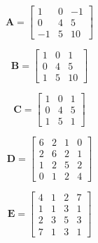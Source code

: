\documentclass[letterpaper, 12pt]{article}
\begin{document}
\begin{center}
    \begin{minipage}{0.32\textwidth}
    \centering
    \[
    \mathbf{A} =
    \begin{bmatrix}
    1 & 0 & -1 \\
    0 & 4 & 5 \\
    -1 & 5 & 10
    \end{bmatrix}
    \]
    \end{minipage}
    \hfill
    \begin{minipage}{0.32\textwidth}
    \centering
    \[
    \mathbf{B} =
    \begin{bmatrix}
    1 & 0 & 1 \\
    0 & 4 & 5 \\
    1 & 5 & 10
    \end{bmatrix}
    \]
    \end{minipage}
    \hfill
    \begin{minipage}{0.32\textwidth}
    \centering
    \[
    \mathbf{C} =
    \begin{bmatrix}
    1 & 0 & 1 \\
    0 & 4 & 5 \\
    1 & 5 & 1
    \end{bmatrix}
    \]
    \end{minipage}
\end{center}

\begin{center}
    \begin{minipage}{0.48\textwidth}
    \centering
    \[
    \mathbf{D} =
    \begin{bmatrix}
    6 & 2 & 1 & 0 \\
    2 & 6 & 2 & 1 \\
    1 & 2 & 5 & 2 \\
    0 & 1 & 2 & 4
    \end{bmatrix}
    \]
    \end{minipage}
    \hfill
    \begin{minipage}{0.48\textwidth}
    \centering
    \[
    \mathbf{E} =
    \begin{bmatrix}
    4 & 1 & 2 & 7 \\
    1 & 1 & 3 & 1 \\
    2 & 3 & 5 & 3 \\
    7 & 1 & 3 & 1
    \end{bmatrix}
    \]
    \end{minipage}
\end{center}
\end{document}
